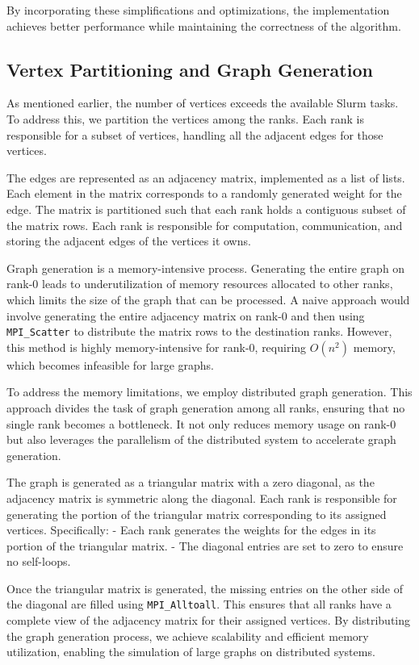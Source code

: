 \documentclass[english, 12pt, a4paper, elec, utf8, a-2b, online]{aaltothesis}
\begin{document}
By incorporating these simplifications and optimizations, the implementation achieves better performance while maintaining the correctness of the algorithm.

\subsection{Vertex Partitioning and Graph Generation}
As mentioned earlier, the number of vertices exceeds the available Slurm tasks. To address this, we partition the vertices among the ranks. Each rank is responsible for a subset of vertices, handling all the adjacent edges for those vertices.

The edges are represented as an adjacency matrix, implemented as a list of lists. Each element in the matrix corresponds to a randomly generated weight for the edge. The matrix is partitioned such that each rank holds a contiguous subset of the matrix rows. Each rank is responsible for computation, communication, and storing the adjacent edges of the vertices it owns.

Graph generation is a memory-intensive process. Generating the entire graph on rank-0 leads to underutilization of memory resources allocated to other ranks, which limits the size of the graph that can be processed. A naive approach would involve generating the entire adjacency matrix on rank-0 and then using \texttt{MPI\_Scatter} to distribute the matrix rows to the destination ranks. However, this method is highly memory-intensive for rank-0, requiring $O(n^2)$ memory, which becomes infeasible for large graphs.

To address the memory limitations, we employ distributed graph generation. This approach divides the task of graph generation among all ranks, ensuring that no single rank becomes a bottleneck. It not only reduces memory usage on rank-0 but also leverages the parallelism of the distributed system to accelerate graph generation.

The graph is generated as a triangular matrix with a zero diagonal, as the adjacency matrix is symmetric along the diagonal. Each rank is responsible for generating the portion of the triangular matrix corresponding to its assigned vertices. Specifically:
- Each rank generates the weights for the edges in its portion of the triangular matrix.
- The diagonal entries are set to zero to ensure no self-loops.

Once the triangular matrix is generated, the missing entries on the other side of the diagonal are filled using \texttt{MPI\_Alltoall}. This ensures that all ranks have a complete view of the adjacency matrix for their assigned vertices. By distributing the graph generation process, we achieve scalability and efficient memory utilization, enabling the simulation of large graphs on distributed systems.
\end{document}
